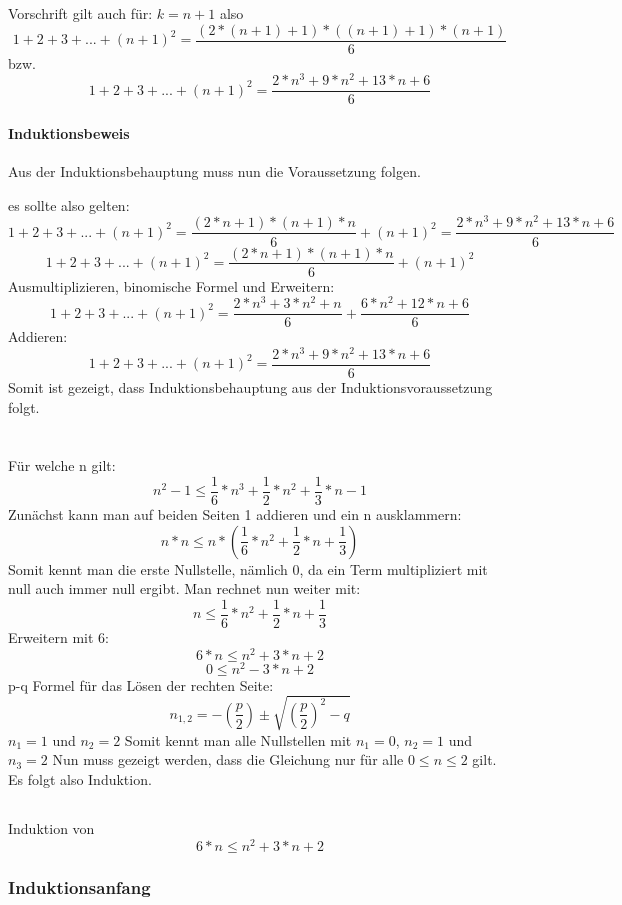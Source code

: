 \documentclass{article}
\begin{document}
Vorschrift gilt auch für: $k=n+1$ also \[1+2+3+...+(n+1)^2 = \frac{(2*(n+1)+1)*((n+1)+1)*(n+1)}{6} \]
bzw.
\[1+2+3+...+(n+1)^2 = \frac{2*n^3+9*n^2+13*n+6}{6} \]
\clearpage
\paragraph{Induktionsbeweis}\mbox{}

Aus der Induktionsbehauptung muss nun die Voraussetzung folgen.

es sollte also gelten: \[1+2+3+...+(n+1)^2 = \frac{(2*n+1)*(n+1)*n}{6} + (n+1)^2= \frac{2*n^3+9*n^2+13*n+6}{6}\]
\[1+2+3+...+(n+1)^2 = \frac{(2*n+1)*(n+1)*n}{6}+(n+1)^2 \]
Ausmultiplizieren, binomische Formel und Erweitern:
\[1+2+3+...+(n+1)^2 = \frac{2*n^3+3*n^2+n}{6}+\frac{6*n^2+12*n+6}{6} \]
Addieren:
\[1+2+3+...+(n+1)^2 =  \frac{2*n^3+9*n^2+13*n+6}{6} \]
\newline
Somit ist gezeigt, dass Induktionsbehauptung aus der Induktionsvoraussetzung folgt.

\section{}
\subsection{}
Für welche n gilt:
\[n^2-1 \le \frac{1}{6}*n^3+\frac{1}{2}*n^2+\frac{1}{3}*n-1\]
Zunächst kann man auf beiden Seiten 1 addieren und ein n ausklammern:
\[n*n \le n*(\frac{1}{6}*n^2+\frac{1}{2}*n+\frac{1}{3})\]
Somit kennt man die erste Nullstelle, nämlich 0, da ein Term multipliziert mit null auch immer null ergibt.
Man rechnet nun weiter mit:
\[n \le \frac{1}{6}*n^2+\frac{1}{2}*n+\frac{1}{3}\]
Erweitern mit 6:
\[6*n \le n^2+3*n+2\]
\[0 \le n^2-3*n+2\]
p-q Formel für das Lösen der rechten Seite: \[n_{1,2} = -\left(\frac{p}{2}\right) \pm \sqrt{ \left(\frac{p}{2}\right)^{2}-q} \]
 $n_1=1$ und  $n_2=2$
 \newline
 Somit kennt man alle Nullstellen mit $n_1=0$,  $n_2=1$ und  $n_3=2$
 \newline
 Nun muss gezeigt werden, dass die Gleichung nur für alle  $0\le n \le 2$ gilt. Es folgt also Induktion.
 \subsection{}
Induktion von \[6*n \le n^2+3*n+2\]
\subsubsection{Induktionsanfang}
\end{document}
